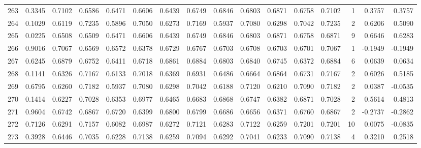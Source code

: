 \begin{tabular}{lrrrrrrrrrrrrrrr}
263 &      0.3345 &  0.7102 &  0.6586 &  0.6471 &  0.6606 &  0.6439 &  0.6749 &  0.6846 &  0.6803 &  0.6871 &   0.6758 &     0.7102 &      1 &                    0.3757 &                     0.3757 \\
264 &      0.1029 &  0.6119 &  0.7235 &  0.5896 &  0.7050 &  0.6273 &  0.7169 &  0.5937 &  0.7080 &  0.6298 &   0.7042 &     0.7235 &      2 &                    0.6206 &                     0.5090 \\
265 &      0.0225 &  0.6508 &  0.6509 &  0.6471 &  0.6606 &  0.6439 &  0.6749 &  0.6846 &  0.6803 &  0.6871 &   0.6758 &     0.6871 &      9 &                    0.6646 &                     0.6283 \\
266 &      0.9016 &  0.7067 &  0.6569 &  0.6572 &  0.6378 &  0.6729 &  0.6767 &  0.6703 &  0.6708 &  0.6703 &   0.6701 &     0.7067 &      1 &                   -0.1949 &                    -0.1949 \\
267 &      0.6245 &  0.6879 &  0.6752 &  0.6411 &  0.6718 &  0.6861 &  0.6884 &  0.6803 &  0.6840 &  0.6745 &   0.6372 &     0.6884 &      6 &                    0.0639 &                     0.0634 \\
268 &      0.1141 &  0.6326 &  0.7167 &  0.6133 &  0.7018 &  0.6369 &  0.6931 &  0.6486 &  0.6664 &  0.6864 &   0.6731 &     0.7167 &      2 &                    0.6026 &                     0.5185 \\
269 &      0.6795 &  0.6260 &  0.7182 &  0.5937 &  0.7080 &  0.6298 &  0.7042 &  0.6188 &  0.7120 &  0.6210 &   0.7090 &     0.7182 &      2 &                    0.0387 &                    -0.0535 \\
270 &      0.1414 &  0.6227 &  0.7028 &  0.6353 &  0.6977 &  0.6465 &  0.6683 &  0.6868 &  0.6747 &  0.6382 &   0.6871 &     0.7028 &      2 &                    0.5614 &                     0.4813 \\
271 &      0.9604 &  0.6742 &  0.6867 &  0.6720 &  0.6399 &  0.6800 &  0.6799 &  0.6686 &  0.6656 &  0.6371 &   0.6760 &     0.6867 &      2 &                   -0.2737 &                    -0.2862 \\
272 &      0.7126 &  0.6291 &  0.7157 &  0.6082 &  0.6987 &  0.6272 &  0.7121 &  0.6283 &  0.7122 &  0.6259 &   0.7201 &     0.7201 &     10 &                    0.0075 &                    -0.0835 \\
273 &      0.3928 &  0.6446 &  0.7035 &  0.6228 &  0.7138 &  0.6259 &  0.7094 &  0.6292 &  0.7041 &  0.6233 &   0.7090 &     0.7138 &      4 &                    0.3210 &                     0.2518 \\

\end{tabular}
